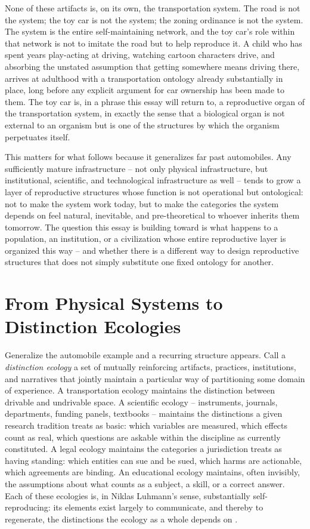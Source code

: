 \documentclass[11pt]{article}
\theoremstyle{plain}
\begin{document}
None of these artifacts is, on its own, the transportation system. The road is not the system; the toy car is not the system; the zoning ordinance is not the system. The system is the entire self-maintaining network, and the toy car's role within that network is not to imitate the road but to help reproduce it. A child who has spent years play-acting at driving, watching cartoon characters drive, and absorbing the unstated assumption that getting somewhere means driving there, arrives at adulthood with a transportation ontology already substantially in place, long before any explicit argument for car ownership has been made to them. The toy car is, in a phrase this essay will return to, a reproductive organ of the transportation system, in exactly the sense that a biological organ is not external to an organism but is one of the structures by which the organism perpetuates itself.

This matters for what follows because it generalizes far past automobiles. Any sufficiently mature infrastructure -- not only physical infrastructure, but institutional, scientific, and technological infrastructure as well -- tends to grow a layer of reproductive structures whose function is not operational but ontological: not to make the system work today, but to make the categories the system depends on feel natural, inevitable, and pre-theoretical to whoever inherits them tomorrow. The question this essay is building toward is what happens to a population, an institution, or a civilization whose entire reproductive layer is organized this way -- and whether there is a different way to design reproductive structures that does not simply substitute one fixed ontology for another.

\section{From Physical Systems to Distinction Ecologies}
\label{sec:distinction-ecologies}

Generalize the automobile example and a recurring structure appears. Call a \emph{distinction ecology} a set of mutually reinforcing artifacts, practices, institutions, and narratives that jointly maintain a particular way of partitioning some domain of experience. A transportation ecology maintains the distinction between drivable and undrivable space. A scientific ecology -- instruments, journals, departments, funding panels, textbooks -- maintains the distinctions a given research tradition treats as basic: which variables are measured, which effects count as real, which questions are askable within the discipline as currently constituted. A legal ecology maintains the categories a jurisdiction treats as having standing: which entities can sue and be sued, which harms are actionable, which agreements are binding. An educational ecology maintains, often invisibly, the assumptions about what counts as a subject, a skill, or a correct answer. Each of these ecologies is, in Niklas Luhmann's sense, substantially self-reproducing: its elements exist largely to communicate, and thereby to regenerate, the distinctions the ecology as a whole depends on \cite{luhmann1995}.
\end{document}

